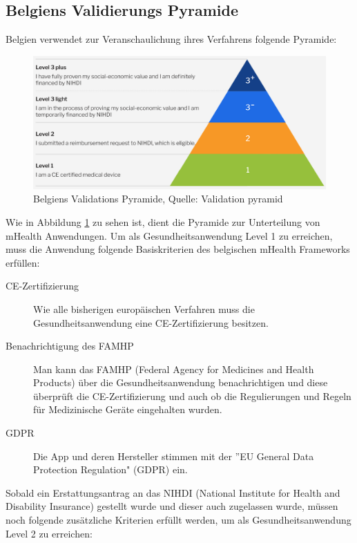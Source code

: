 \documentclass{article}
\begin{document}
		\subsection{Belgiens Validierungs Pyramide}
			Belgien verwendet zur Veranschaulichung ihres Verfahrens folgende Pyramide:\par
			\begin{figure}[htbp]
				\centering
				\includegraphics[width=\textwidth]{./grafiken/belgien_validation_pyramide}
				\caption[Belgiens Verfahren]{Belgiens Validations Pyramide, Quelle: Validation pyramid \cite{belgien-pyramide}}
				\label{belgien-validierung}
			\end{figure}
			Wie in Abbildung \ref{belgien-validierung} zu sehen ist, dient die Pyramide zur Unterteilung von mHealth Anwendungen.
			Um als Gesundheitsanwendung Level 1 zu erreichen, muss die Anwendung folgende Basiskriterien des belgischen mHealth Frameworks erfüllen:
			\begin{description}
				\item[CE-Zertifizierung] Wie alle bisherigen europäischen Verfahren muss die Gesundheitsanwendung eine CE-Zertifizierung besitzen.
				\item[Benachrichtigung des FAMHP] Man kann das FAMHP (Federal Agency for Medicines and Health Products) über die Gesundheitsanwendung benachrichtigen und diese überprüft die CE-Zertifizierung und auch ob die Regulierungen und Regeln für Medizinische Geräte eingehalten wurden.    
				\item[GDPR] Die App und deren Hersteller stimmen mit der ''EU General Data Protection Regulation" (GDPR) ein.
			\end{description}
			Sobald ein Erstattungsantrag an das NIHDI (National Institute for Health and Disability Insurance) gestellt wurde und dieser auch zugelassen wurde, müssen noch folgende zusätzliche Kriterien erfüllt werden, um als Gesundheitsanwendung Level 2 zu erreichen:
\end{document}
